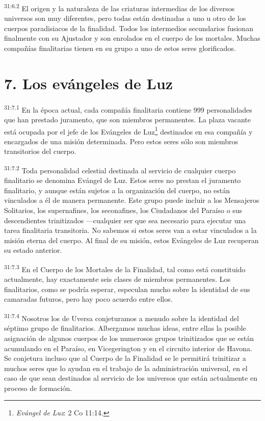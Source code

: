 \par
\textsuperscript{31:6.2} El origen y la naturaleza de las criaturas intermedias de los diversos universos son muy diferentes, pero todas están destinadas a uno u otro de los cuerpos paradisiacos de la finalidad. Todos los intermedios secundarios fusionan finalmente con su Ajustador y son enrolados en el cuerpo de los mortales. Muchas compañías finalitarias tienen en su grupo a uno de estos seres glorificados.

\section*{7. Los evángeles de Luz}
\par
\textsuperscript{31:7.1} En la época actual, cada compañía finalitaria contiene 999 personalidades que han prestado juramento, que son miembros permanentes. La plaza vacante está ocupada por el jefe de los Evángeles de Luz\footnote{\textit{Evángel de Luz}: 2 Co 11:14.} destinados en esa compañía y encargados de una misión determinada. Pero estos seres sólo son miembros transitorios del cuerpo.

\par
\textsuperscript{31:7.2} Toda personalidad celestial destinada al servicio de cualquier cuerpo finalitario se denomina Evángel de Luz. Estos seres no prestan el juramento finalitario, y aunque están sujetos a la organización del cuerpo, no están vinculados a él de manera permanente. Este grupo puede incluir a los Mensajeros Solitarios, los supernafines, los seconafines, los Ciudadanos del Paraíso o sus descendientes trinitizados ---cualquier ser que sea necesario para ejecutar una tarea finalitaria transitoria. No sabemos si estos seres van a estar vinculados a la misión eterna del cuerpo. Al final de su misión, estos Evángeles de Luz recuperan su estado anterior.

\par
\textsuperscript{31:7.3} En el Cuerpo de los Mortales de la Finalidad, tal como está constituido actualmente, hay exactamente seis clases de miembros permanentes. Los finalitarios, como se podría esperar, especulan mucho sobre la identidad de sus camaradas futuros, pero hay poco acuerdo entre ellos.

\par
\textsuperscript{31:7.4} Nosotros los de Uversa conjeturamos a menudo sobre la identidad del séptimo grupo de finalitarios. Albergamos muchas ideas, entre ellas la posible asignación de algunos cuerpos de los numerosos grupos trinitizados que se están acumulando en el Paraíso, en Vicegerington y en el circuito interior de Havona. Se conjetura incluso que al Cuerpo de la Finalidad se le permitirá trinitizar a muchos seres que lo ayudan en el trabajo de la administración universal, en el caso de que sean destinados al servicio de los universos que están actualmente en proceso de formación.

